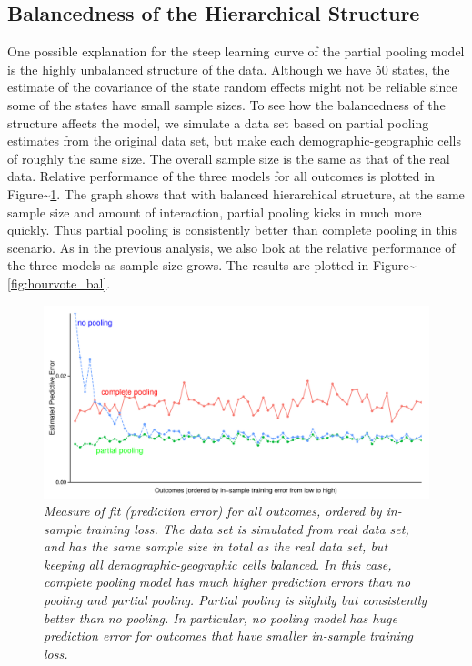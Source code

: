 \documentclass[11pt,article,oneside]{memoir}
\begin{document}
\subsection{Balancedness of the Hierarchical
Structure}\label{balancedness-of-the-hierarchical-structure}

One possible explanation for the steep learning curve of the partial
pooling model is the highly unbalanced structure of the data. Although
we have 50 states, the estimate of the covariance of the state random
effects might not be reliable since some of the states have small sample
sizes. To see how the balancedness of the structure affects the model,
we simulate a data set based on partial pooling estimates from the
original data set, but make each demographic-geographic cells of roughly
the same size. The overall sample size is the same as that of the real
data. Relative performance of the three models for all outcomes is
plotted in Figure\textasciitilde{}\ref{fig:figbal}. The graph shows that
with balanced hierarchical structure, at the same sample size and amount
of interaction, partial pooling kicks in much more quickly. Thus partial
pooling is consistently better than complete pooling in this scenario.
As in the previous analysis, we also look at the relative performance of
the three models as sample size grows. The results are plotted in
Figure\textasciitilde{}\ref{fig:hourvote_bal}.

\begin{figure}[h]
  \centering
  \includegraphics[width=.45\textwidth]{alloutcomesxbal.pdf}
  \caption{\em Measure of fit (prediction error) for all outcomes, ordered by
    in-sample training loss. The data set is simulated from real data set, and
    has the same sample size in total as the real data set, but keeping all
    demographic-geographic cells balanced. In this case, complete pooling model
    has much higher prediction errors than no pooling and partial
    pooling. Partial pooling is slightly but consistently better than no
    pooling. In particular, no pooling model has huge prediction error for
    outcomes that have smaller in-sample training loss.}
  \label{fig:figbal}
\end{figure}
\end{document}
